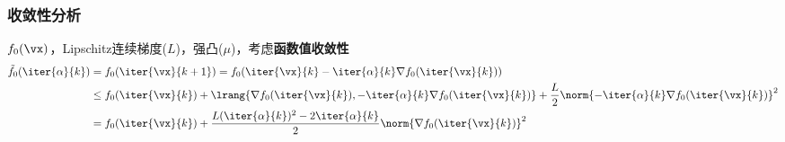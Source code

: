 \subsubsection{收敛性分析}
$f_0(\vx)$，Lipschitz连续梯度($L$)，强凸($\mu$)，考虑\textbf{函数值收敛性}
\[\begin{aligned}
    \tilde{f}_0(\iter{\alpha}{k})&=f_0(\iter{\vx}{k+1})=f_0(\iter{\vx}{k}-\iter{\alpha}{k}\nabla f_0(\iter{\vx}{k}))\\
    &\leq f_0(\iter{\vx}{k})+\lrang{\nabla f_0(\iter{\vx}{k}),-\iter{\alpha}{k}\nabla f_0(\iter{\vx}{k})}+\frac{L}{2}\norm{-\iter{\alpha}{k}\nabla f_0(\iter{\vx}{k})}^2\\
    &=f_0(\iter{\vx}{k})+\frac{L(\iter{\alpha}{k})^2-2\iter{\alpha}{k}}{2}\norm{\nabla f_0(\iter{\vx}{k})}^2
\end{aligned}\]

